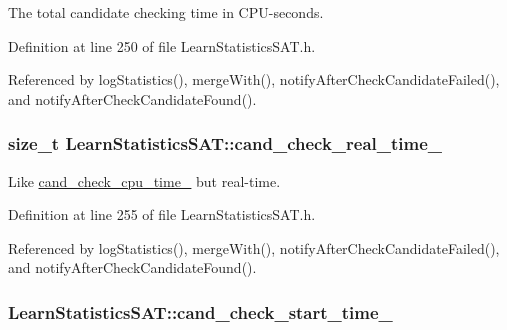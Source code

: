 The total candidate checking time in C\-P\-U-\/seconds. 



Definition at line 250 of file Learn\-Statistics\-S\-A\-T.\-h.



Referenced by log\-Statistics(), merge\-With(), notify\-After\-Check\-Candidate\-Failed(), and notify\-After\-Check\-Candidate\-Found().

\hypertarget{classLearnStatisticsSAT_a2e0611b0c6f80cbc7b36f25ce5e89db9}{
\subsubsection[{cand\-\_\-check\-\_\-real\-\_\-time\-\_\-}]{\setlength{\rightskip}{0pt plus 5cm}size\-\_\-t Learn\-Statistics\-S\-A\-T\-::cand\-\_\-check\-\_\-real\-\_\-time\-\_\-\hspace{0.3cm}{\ttfamily [protected]}}}\label{classLearnStatisticsSAT_a2e0611b0c6f80cbc7b36f25ce5e89db9}


Like \hyperlink{classLearnStatisticsSAT_a2ab5cd522b7a4d700a11c0bb430baa81}{cand\-\_\-check\-\_\-cpu\-\_\-time\-\_\-} but real-\/time. 



Definition at line 255 of file Learn\-Statistics\-S\-A\-T.\-h.



Referenced by log\-Statistics(), merge\-With(), notify\-After\-Check\-Candidate\-Failed(), and notify\-After\-Check\-Candidate\-Found().

\hypertarget{classLearnStatisticsSAT_a1effa4c15e4349fb1e6f62ad6c79d6c5}{
\subsubsection[{cand\-\_\-check\-\_\-start\-\_\-time\-\_\-}]{ Learn\-Statistics\-S\-A\-T\-::cand\-\_\-check\-\_\-start\-\_\-time\-\_\-\hspace{0.3cm}{\ttfamily [protected]}}}\label{classLearnStatisticsSAT_a1effa4c15e4349fb1e6f62ad6c79d6c5}


